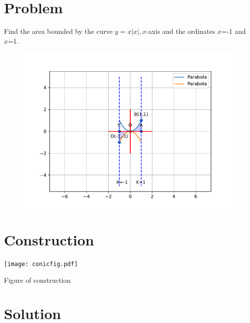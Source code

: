 \documentclass[10pt, a4paper]{article}
\title{\mytitle}
\author{\myauthor\hspace{1em}\\\contact\\FWC22066\hspace{6.5em}IITH\hspace{0.5em}\mymodule\hspace{6em}Assignment}
\begin{document}
	\maketitle
	\tableofcontents
   \section{Problem}
   \fi
Find   the area bounded by the curve $y=x|x|, x$-axis and the ordinates $x$=-1 and $x$=1.
\\
\solution 
	\begin{figure}[!h]
		\centering
 \includegraphics[width=\columnwidth]{chapters/12/8/3/17/figs/conicfig.pdf}
		\caption{}
		\label{fig:12/8/3/17}
  	\end{figure}
   \iffalse
[Hint: y=$x^2$ if $x>0$  and y=$-x^2$ if $x<0$]
   					
\section{Construction}
  \texttt{[image: conicfig.pdf]}
  	\begin{center}
  Figure of construction
  	\end{center}
  \section{Solution}
  
\end{document}
